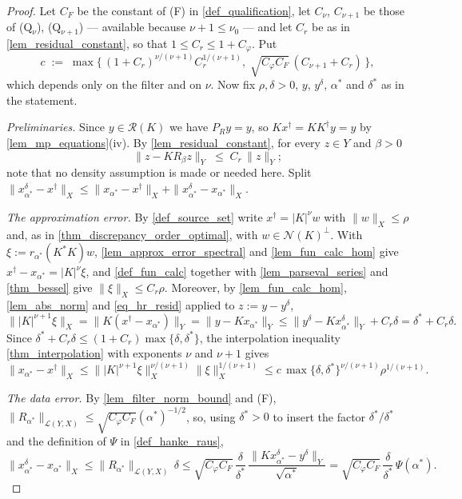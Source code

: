 \documentclass[a4paper]{report}
\theoremstyle{plain}
\theoremstyle{definition}
\theoremstyle{remark}
\newcommand{\Ll}{\mathcal{L}}
\newcommand{\Ran}{\mathcal{R}}
\newcommand{\Ker}{\mathcal{N}}
\newcommand{\dg}{^{\dagger}}
\begin{document}
\begin{proof}
  Let $C_F$ be the constant of (F) in \cref{def_qualification}, let $C_{\nu}$,
  $C_{\nu+1}$ be those of (Q$_{\nu}$),
  (Q$_{\nu+1}$) --- available because $\nu + 1 \le \nu_0$ --- and let $C_r$ be as in
  \cref{lem_residual_constant}, so that $1 \le C_r \le 1 + C_{\varphi}$.  Put
  \[
    c \;:=\; \max\bigl\{\,(1+C_r)^{\nu/(\nu+1)}C_r^{1/(\nu+1)},\;
      \sqrt{C_{\varphi}C_F}\,(C_{\nu+1} + C_r)\,\bigr\} ,
  \]
  which depends only on the filter and on $\nu$.  Now fix $\rho,\delta > 0$, $y$,
  $y^{\delta}$, $\alpha^{*}$ and $\delta^{*}$ as in the statement.

  \emph{Preliminaries.}  Since $y \in \Ran(K)$ we have $P_Ry = y$, so
  $Kx\dg = KK\dg y = y$ by \cref{lem_mp_equations}(iv).  By
  \cref{lem_residual_constant}, for every $z \in Y$ and $\beta > 0$
  \begin{equation}\label{eq_hr_resid}
    \|z - KR_{\beta}z\|_Y \;\le\; C_r\,\|z\|_Y ;
  \end{equation}
  note that no density assumption is made or needed here.  Split
  $\|x^{\delta}_{\alpha^{*}} - x\dg\|_X \le \|x_{\alpha^{*}} - x\dg\|_X +
  \|x^{\delta}_{\alpha^{*}} - x_{\alpha^{*}}\|_X$.

  \emph{The approximation error.}  By \cref{def_source_set} write $x\dg = |K|^{\nu}w$
  with $\|w\|_X \le \rho$ and, as in \cref{thm_discrepancy_order_optimal}, with
  $w \in \Ker(K)^{\perp}$.  With $\xi := r_{\alpha^{*}}(K^{*}K)w$,
  \cref{lem_approx_error_spectral} and \cref{lem_fun_calc_hom} give $x\dg -
  x_{\alpha^{*}} = |K|^{\nu}\xi$, and \cref{def_fun_calc} together with
  \cref{lem_parseval_series} and \cref{thm_bessel} give $\|\xi\|_X \le C_r\rho$.
  Moreover, by \cref{lem_fun_calc_hom}, \cref{lem_abs_norm} and
  \eqref{eq_hr_resid} applied to $z := y - y^{\delta}$,
  \[
    \||K|^{\nu+1}\xi\|_X = \|K(x\dg - x_{\alpha^{*}})\|_Y = \|y - Kx_{\alpha^{*}}\|_Y
      \le \|y^{\delta} - Kx^{\delta}_{\alpha^{*}}\|_Y + C_r\delta
      = \delta^{*} + C_r\delta .
  \]
  Since $\delta^{*} + C_r\delta \le (1 + C_r)\max\{\delta,\delta^{*}\}$, the
  interpolation inequality \cref{thm_interpolation} with exponents $\nu$ and $\nu+1$ gives
  \[
    \|x_{\alpha^{*}} - x\dg\|_X \le \||K|^{\nu+1}\xi\|_X^{\nu/(\nu+1)}
      \|\xi\|_X^{1/(\nu+1)}
      \le c\,\max\{\delta,\delta^{*}\}^{\nu/(\nu+1)}\rho^{1/(\nu+1)} .
  \]

  \emph{The data error.}  By \cref{lem_filter_norm_bound} and (F),
  $\|R_{\alpha^{*}}\|_{\Ll(Y,X)} \le \sqrt{C_{\varphi}C_F}(\alpha^{*})^{-1/2}$, so, using
  $\delta^{*} > 0$ to insert the factor $\delta^{*}/\delta^{*}$ and the definition of
  $\Psi$ in \cref{def_hanke_raus},
  \[
    \|x^{\delta}_{\alpha^{*}} - x_{\alpha^{*}}\|_X \le \|R_{\alpha^{*}}\|_{\Ll(Y,X)}\,
      \delta \le \sqrt{C_{\varphi}C_F}\,\frac{\delta}{\delta^{*}}\,
      \frac{\|Kx^{\delta}_{\alpha^{*}} - y^{\delta}\|_Y}{\sqrt{\alpha^{*}}}
      = \sqrt{C_{\varphi}C_F}\,\frac{\delta}{\delta^{*}}\,\Psi(\alpha^{*}) .
  \]


\end{proof}
\end{document}
